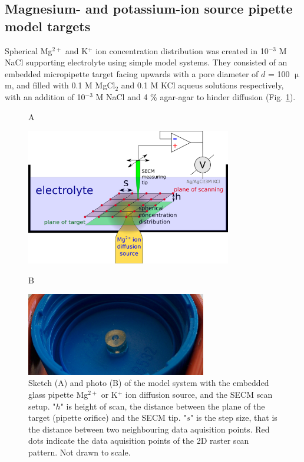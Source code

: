 	\subsection{Magnesium- and potassium-ion source pipette model targets}
Spherical Mg$^{2+}$ and K$^+$ ion concentration distribution was created in 10$^{-3}$ M NaCl supporting electrolyte using simple model systems.
They consisted of an embedded micropipette target facing upwards with a pore diameter of $d$ = 100 $\upmu$m, and filled with 0.1 M MgCl$_2$ and 0.1 M KCl aqueus solutions respectively, with an addition of 10$^{-3}$ M NaCl and 4 \% agar-agar to hinder diffusion (Fig. \ref{fig:setup}).

\begin{figure}
\centering
\begin{flushleft}
\hspace{1.5cm} A
\end{flushleft}

\includegraphics[width=0.8\textwidth]{img/setup.eps}\vspace{5mm}

\begin{flushleft}
\hspace{1.5cm} B
\end{flushleft}

\includegraphics[width=0.7\textwidth]{img/pipette_source.jpg}
\caption[Sketch and photo of the model system with the embedded glass pipette Mg$^{2+}$ or K$^+$ ion diffusion source, and the SECM scan setup.]{Sketch (A) and photo (B) of the model system with the embedded glass pipette Mg$^{2+}$ or K$^+$ ion diffusion source, and the SECM scan setup.
"$h$" is height of scan, the distance between the plane of the target (pipette orifice) and the SECM tip.
"$s$" is the step size, that is the distance between two neighbouring data aquisition points.
Red dots indicate the data aquisition points of the 2D raster scan pattern.
Not drawn to scale.}
\label{fig:setup}
\end{figure}


